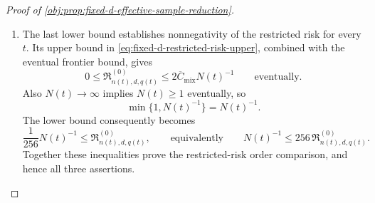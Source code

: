 \begin{proof}[Proof of \cref{obj:prop:fixed-d-effective-sample-reduction}]
\begin{enumerate}
The estimator class is nonempty: the constant kernel
\[
\mathsf T^{0}(o,dh):=\operatorname{Dirac}_{0}(dh)
\]
is admissible. Moreover, binary potential outcomes imply
\(\tau(P)\in[-1,1]\), and the kernel outputs lie in \([-1,1]\), so
\[
0\le E_P[(\mathsf T-\tau(P))^2]\le4
\]
for every full-data law \(P\) and admissible \(\mathsf T\).
Both testing laws belong to the full model and to its restricted subclass.
Their maximum risk therefore bounds each corresponding worst-case risk
from below; the uniform bound by \(4\) ensures these suprema are finite.
Taking the infimum over estimators gives
\[
\frac1{256}\min\{1,N(t)^{-1}\}
\le
\mathfrak R_{n(t),d,q(t)},
\qquad
\frac1{256}\min\{1,N(t)^{-1}\}
\le
\mathfrak R^{(0)}_{n(t),d,q(t)}.
\]

\item The last lower bound establishes nonnegativity of the restricted risk
for every \(t\). Its upper bound in \cref{eq:fixed-d-restricted-risk-upper}, combined with the eventual
frontier bound, gives
\[
0\le
\mathfrak R^{(0)}_{n(t),d,q(t)}
\le
2\overline C_{\mathrm{mix}}N(t)^{-1}
\qquad\text{eventually}.
\]
Also \(N(t)\to\infty\) implies \(N(t)\ge1\) eventually, so
\[
\min\{1,N(t)^{-1}\}=N(t)^{-1}.
\]
The lower bound consequently becomes
\[
\frac1{256}N(t)^{-1}
\le
\mathfrak R^{(0)}_{n(t),d,q(t)},
\qquad\text{equivalently}\qquad
N(t)^{-1}\le256\,\mathfrak R^{(0)}_{n(t),d,q(t)}.
\]
Together these inequalities prove the restricted-risk order comparison,
and hence all three assertions.
\end{enumerate}
\end{proof}

